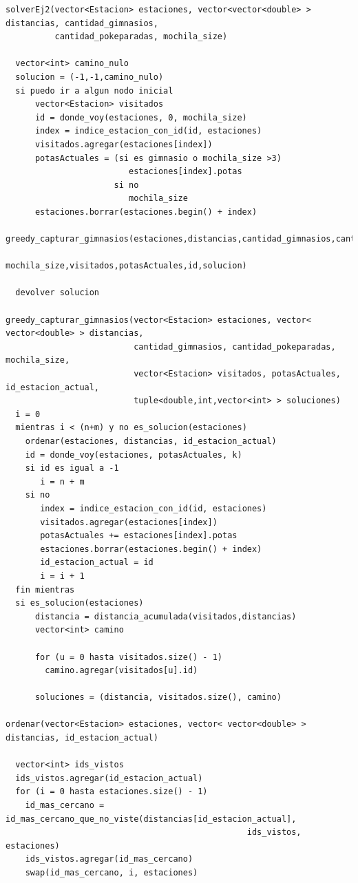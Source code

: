             \begin{codesnippet}
            \begin{verbatim}
solverEj2(vector<Estacion> estaciones, vector<vector<double> > distancias, cantidad_gimnasios,
          cantidad_pokeparadas, mochila_size)
  
  vector<int> camino_nulo
  solucion = (-1,-1,camino_nulo)
  si puedo ir a algun nodo inicial
      vector<Estacion> visitados
      id = donde_voy(estaciones, 0, mochila_size)
      index = indice_estacion_con_id(id, estaciones)
      visitados.agregar(estaciones[index])
      potasActuales = (si es gimnasio o mochila_size >3)
                         estaciones[index].potas
                      si no 
                         mochila_size 
      estaciones.borrar(estaciones.begin() + index)
      greedy_capturar_gimnasios(estaciones,distancias,cantidad_gimnasios,cantidad_pokeparadas,
                                mochila_size,visitados,potasActuales,id,solucion)
  
  devolver solucion

greedy_capturar_gimnasios(vector<Estacion> estaciones, vector< vector<double> > distancias, 
                          cantidad_gimnasios, cantidad_pokeparadas, mochila_size, 
                          vector<Estacion> visitados, potasActuales, id_estacion_actual, 
                          tuple<double,int,vector<int> > soluciones)
  i = 0
  mientras i < (n+m) y no es_solucion(estaciones)
    ordenar(estaciones, distancias, id_estacion_actual)
    id = donde_voy(estaciones, potasActuales, k)
    si id es igual a -1
       i = n + m
    si no
       index = indice_estacion_con_id(id, estaciones)
       visitados.agregar(estaciones[index])
       potasActuales += estaciones[index].potas
       estaciones.borrar(estaciones.begin() + index)
       id_estacion_actual = id
       i = i + 1
  fin mientras
  si es_solucion(estaciones)
      distancia = distancia_acumulada(visitados,distancias)
      vector<int> camino

      for (u = 0 hasta visitados.size() - 1)
        camino.agregar(visitados[u].id)

      soluciones = (distancia, visitados.size(), camino)

ordenar(vector<Estacion> estaciones, vector< vector<double> > distancias, id_estacion_actual)

  vector<int> ids_vistos
  ids_vistos.agregar(id_estacion_actual)
  for (i = 0 hasta estaciones.size() - 1)
    id_mas_cercano = id_mas_cercano_que_no_viste(distancias[id_estacion_actual], 
                                                 ids_vistos, estaciones)
    ids_vistos.agregar(id_mas_cercano)
    swap(id_mas_cercano, i, estaciones)
            \end{verbatim}
            \end{codesnippet}





